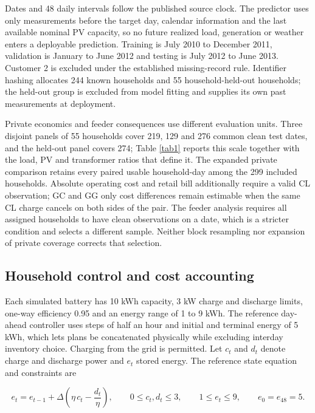 \documentclass[pdflatex,Numbered,sn-basic]{sn-jnl}
\begin{document}
Dates and 48 daily intervals follow the published source clock. The predictor uses only measurements before the target day, calendar information and the last available nominal PV capacity, so no future realized load, generation or weather enters a deployable prediction. Training is July 2010 to December 2011, validation is January to June 2012 and testing is July 2012 to June 2013. Customer 2 is excluded under the established missing-record rule. Identifier hashing allocates 244 known households and 55 household-held-out households; the held-out group is excluded from model fitting and supplies its own past measurements at deployment.

Private economics and feeder consequences use different evaluation units. Three disjoint panels of 55 households cover 219, 129 and 276 common clean test dates, and the held-out panel covers 274; Table \ref{tab1} reports this scale together with the load, PV and transformer ratios that define it. The expanded private comparison retains every paired usable household-day among the 299 included households. Absolute operating cost and retail bill additionally require a valid CL observation; GC and GG only cost differences remain estimable when the same CL charge cancels on both sides of the pair. The feeder analysis requires all assigned households to have clean observations on a date, which is a stricter condition and selects a different sample. Neither block resampling nor expansion of private coverage corrects that selection.

\subsection{Household control and cost accounting}

Each simulated battery has 10 kWh capacity, 3 kW charge and discharge limits, one-way efficiency 0.95 and an energy range of 1 to 9 kWh. The reference day-ahead controller uses steps of half an hour and initial and terminal energy of 5 kWh, which lets plans be concatenated physically while excluding interday inventory choice. Charging from the grid is permitted. Let $c_t$ and $d_t$ denote charge and discharge power and $e_t$ stored energy. The reference state equation and constraints are

\begin{equation}
e_t = e_{t-1} + \Delta\left(\eta\, c_t - \frac{d_t}{\eta}\right),\qquad 0 \le c_t, d_t \le 3,\qquad 1 \le e_t \le 9,\qquad e_0 = e_{48} = 5.
\label{eq1}
\end{equation}
\end{document}
